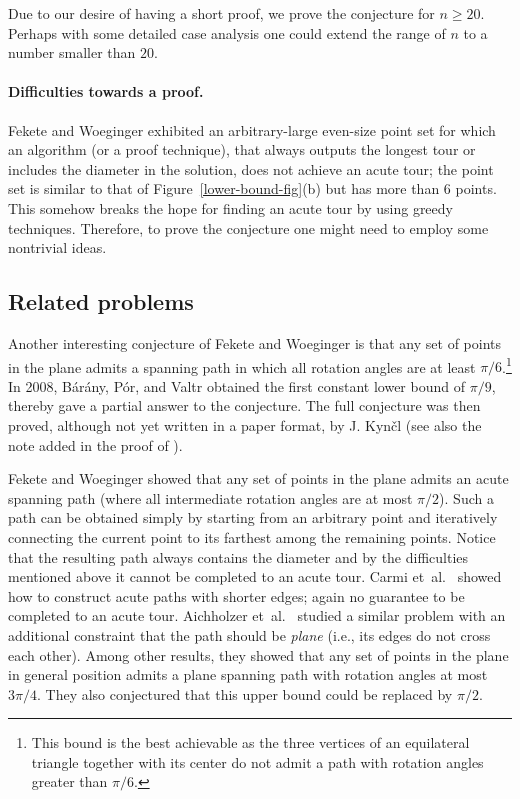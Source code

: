 \documentclass[11pt,letter]{article}
\newcommand{\etal}{{et~al.}}
\begin{document}
Due to our desire of having a short proof, we prove the conjecture for $n\geqslant 20$. Perhaps with some detailed case analysis one could extend the range of $n$ to a number smaller than $20$.
\paragraph{Difficulties towards a proof.} Fekete and Woeginger \cite{Fekete1997} exhibited an arbitrary-large even-size point set for which an algorithm (or a proof technique), that always outputs the longest tour or includes the diameter in the solution, does not achieve an acute tour; the point set is similar to that of Figure~\ref{lower-bound-fig}(b) but has more than $6$ points. This somehow breaks the hope for finding an acute tour by using greedy techniques. Therefore, to prove the conjecture one might need to employ some nontrivial ideas.  

\subsection{Related problems}

Another interesting conjecture of Fekete and Woeginger \cite{Fekete1997} is that any set of points in the plane admits a spanning path in which all rotation angles are at least $\pi/6$.\footnote{This bound is the best achievable as the three vertices of an equilateral triangle together with its center do not admit a path with rotation angles greater than $\pi/6$.} In 2008, B{\'{a}}r{\'{a}}ny, P{\'{o}}r, and
Valtr \cite{Barany2009} obtained the first constant lower bound of $\pi/9$, thereby gave a partial answer to the conjecture. The full conjecture was then proved, although not yet written in a paper format, by J. Kyn\v{c}l \cite{Kyncl2019} (see also the note added in the proof of \cite{Barany2009}). 


Fekete and Woeginger \cite{Fekete1997} showed that any set of points in the plane admits an acute spanning path (where all intermediate rotation angles are at most $\pi/2$). Such a path can be obtained simply by starting from an arbitrary point and iteratively connecting the current point to its farthest among the remaining points. 
Notice that the resulting path always contains the diameter and by the difficulties mentioned above it cannot be completed to an acute tour. 
Carmi \etal~\cite{Carmi2011} showed how to construct acute paths with shorter edges; again no guarantee to be completed to an acute tour. 
Aichholzer \etal~\cite{Aichholzer2013} studied a similar problem with an additional constraint that the path should be {\em plane} (i.e., its edges do not cross each other). Among other results, they showed that any set of points in the plane in general position admits a plane spanning path with rotation angles at most $3\pi/4$. They also conjectured that this upper bound could be replaced by $\pi/2$.
\end{document}
